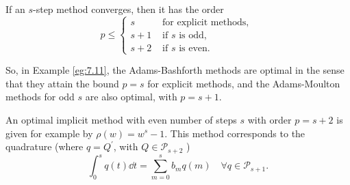 \documentclass[a4paper]{article}
\begin{document}
\begin{theorem}
    If an $s$-step method converges, then it has the order
\[
p \leq \begin{cases}
s & \text { for explicit methods, } \\
s+1 & \text { if } s \text { is odd, } \\
s+2 & \text { if } s \text { is even. }
\end{cases}
\]
\end{theorem}
So, in Example \ref{eg:7.11}, the Adams-Bashforth methods are optimal in the sense that they attain the bound $p=s$ for explicit methods, and the Adams-Moulton methods for odd $s$ are also optimal, with $p=s+1$.

An optimal implicit method with even number of steps $s$ with order $p=s+2$ is given for example by $\rho(w)=w^s-1$. This method corresponds to the quadrature (where $q=Q^{\prime}$, with $Q \in \mathcal{P}_{s+2}$ )
\[
\int_0^s q(t) \dd{t}=\sum_{m=0}^s b_m q(m) \quad \forall q \in \mathcal{P}_{s+1} .
\]
\end{document}
